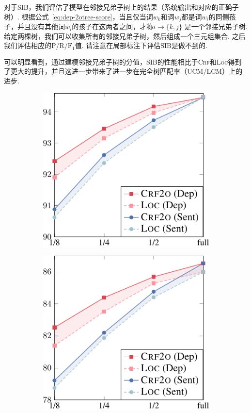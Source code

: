 对于SIB，我们评估了模型在邻接兄弟子树上的结果（系统输出和对应的正确子树）.
根据公式~\ref{eq:dep-2otree-score}，当且仅当词$w_k$和词$w_j$都是词$w_i$的同侧孩子，并且没有其他词$w_i$的孩子在这两者之间，才称$i\rightarrow \{k,j\}$ 是一个邻接兄弟子树.
给定两棵树，我们可以收集所有的邻接兄弟子树，然后组成一个三元组集合.
之后我们评估相应的P/R/$\mathrm{F}_1$值.
请注意在局部标注下评估SIB是做不到的.

可以明显看到，通过建模邻接兄弟子树的分值，SIB的性能相比于\textsc{Crf}和\textsc{Loc}得到了更大的提升，并且这进一步带来了进一步在完全树匹配率（UCM/LCM）上的进步.

\begin{figure}[tb!]
  \centering
  \begin{subfigure}[b]{0.4\textwidth}
    \centering
    \includegraphics[width=1.\textwidth]{figures/part-gap-ptb.pdf}
  \end{subfigure}
  \begin{subfigure}[b]{0.4\textwidth}
    \centering
    \includegraphics[width=1.\textwidth]{figures/part-gap-conll.pdf}

\end{subfigure}
\end{figure}
